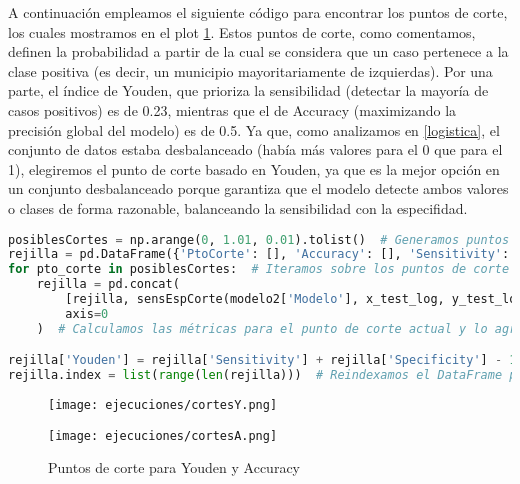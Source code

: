 \documentclass[a4paper,onecolumn]{extarticle}
\begin{document}
\begin{sloppypar}
A continuación empleamos el siguiente código para encontrar los puntos de corte, los cuales mostramos en el plot \ref{fig:puntoscorte}. Estos puntos de corte,
como comentamos, definen la probabilidad a partir de la cual se considera que un caso pertenece a la clase positiva (es decir, un municipio mayoritariamente de
izquierdas). Por una parte, el índice de Youden, que prioriza la sensibilidad (detectar la mayoría de casos positivos) es de 0.23, mientras que el de Accuracy 
(maximizando la precisión global del modelo) es de 0.5. Ya que, como analizamos en \ref{logistica}, el conjunto de datos estaba desbalanceado (había más valores 
para el 0 que para el 1), elegiremos el punto de corte basado en Youden, ya que es la mejor opción en un conjunto desbalanceado porque garantiza que el modelo
detecte ambos valores o clases de forma razonable, balanceando la sensibilidad con la especifidad. 
\begin{lstlisting}[language=Python]
posiblesCortes = np.arange(0, 1.01, 0.01).tolist()  # Generamos puntos de corte de 0 a 1 con intervalo de 0.01
rejilla = pd.DataFrame({'PtoCorte': [], 'Accuracy': [], 'Sensitivity': [], 'Specificity': [], 'PosPredValue': [], 'NegPredValue': []})
for pto_corte in posiblesCortes:  # Iteramos sobre los puntos de corte
    rejilla = pd.concat(
        [rejilla, sensEspCorte(modelo2['Modelo'], x_test_log, y_test_log, pto_corte, modelo2['Variables']['cont'], modelo2['Variables']['categ'], modelo2['Variables']['inter'])],
        axis=0
    )  # Calculamos las métricas para el punto de corte actual y lo agregamos al DataFrame

rejilla['Youden'] = rejilla['Sensitivity'] + rejilla['Specificity'] - 1  # Calculamos el índice de Youden
rejilla.index = list(range(len(rejilla)))  # Reindexamos el DataFrame para que los índices sean consecutivos    
\end{lstlisting}
\begin{figure}[h!]
    \centering
    \begin{minipage}{0.5\textwidth}
        \centering
        \texttt{[image: ejecuciones/cortesY.png]}
    \end{minipage}%
    \begin{minipage}{0.5\textwidth}
        \centering
        \texttt{[image: ejecuciones/cortesA.png]}
    \end{minipage}
    \caption{Puntos de corte para Youden y Accuracy}
    \label{fig:puntoscorte}
\end{figure}


\end{sloppypar}
\end{document}
